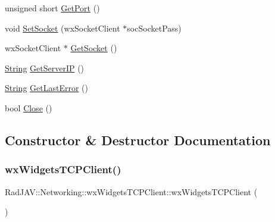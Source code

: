 \begin{DoxyCompactItemize}
\item 
unsigned short \mbox{\hyperlink{class_rad_j_a_v_1_1_networking_1_1wx_widgets_t_c_p_client_a1b51e3638dc1cefcad9926b38e6e1fdb}{Get\+Port}} ()
\item 
void \mbox{\hyperlink{class_rad_j_a_v_1_1_networking_1_1wx_widgets_t_c_p_client_aeb23b2c93b6be3edb631cc47778ffc84}{Set\+Socket}} (wx\+Socket\+Client $\ast$soc\+Socket\+Pass)
\item 
wx\+Socket\+Client $\ast$ \mbox{\hyperlink{class_rad_j_a_v_1_1_networking_1_1wx_widgets_t_c_p_client_a89808fa1a512f020412427d22eb6af8e}{Get\+Socket}} ()
\item 
\mbox{\hyperlink{class_rad_j_a_v_1_1_string}{String}} \mbox{\hyperlink{class_rad_j_a_v_1_1_networking_1_1wx_widgets_t_c_p_client_a6b5ffa78a073659879d3ce2a60e4b1c7}{Get\+Server\+IP}} ()
\item 
\mbox{\hyperlink{class_rad_j_a_v_1_1_string}{String}} \mbox{\hyperlink{class_rad_j_a_v_1_1_networking_1_1wx_widgets_t_c_p_client_a0addc1f9cd997cf6357fe5e655ba40a9}{Get\+Last\+Error}} ()
\item 
bool \mbox{\hyperlink{class_rad_j_a_v_1_1_networking_1_1wx_widgets_t_c_p_client_a6a9a078dcbb3083eae6398e374fb8aa6}{Close}} ()
\end{DoxyCompactItemize}


\subsection{Constructor \& Destructor Documentation}
\mbox{\label{class_rad_j_a_v_1_1_networking_1_1wx_widgets_t_c_p_client_af80442d38749a9cd12a45ef7d8f7928c}} 
\subsubsection{\texorpdfstring{wx\+Widgets\+T\+C\+P\+Client()}{wxWidgetsTCPClient()}}
{\footnotesize\ttfamily Rad\+J\+A\+V\+::\+Networking\+::wx\+Widgets\+T\+C\+P\+Client\+::wx\+Widgets\+T\+C\+P\+Client (\begin{DoxyParamCaption}{ }\end{DoxyParamCaption})}



